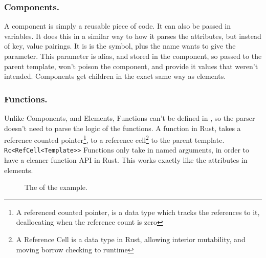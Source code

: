 \subsubsection{Components.}
A component is simply a reusable piece of \languageName{} code. It can also be passed in variables. It does this in a similar way to how it parses the attributes, but instead of key, value pairings. It is is the symbol, plus the name \you{} wants to give the parameter. This parameter is alias, and stored in the component, so  passed to the parent template, won't poison the component, and provide it values that weren't intended. Components get children in the exact same way as elements.
\newpage
\subsubsection{Functions.}
Unlike Components, and Elements, Functions can't be defined in \languageName{}, so the parser doesn't need to parse the logic of the functions. A \languageName{} function in Rust, takes a reference counted pointer\footnote{A referenced counted pointer, is a data type which tracks the references to it, deallocating when the reference count is zero}, to a reference cell\footnote{A Reference Cell is a data type in Rust, allowing interior mutability, and moving borrow checking to runtime} to the parent template. \verb|Rc<RefCell<Template>>| Functions only take in named arguments, in order to have a cleaner function API in Rust. This works exactly like the attributes in elements.


\begin{figure}[!htbp]
    \centering
    \caption{The  of the example.}
\end{figure}

